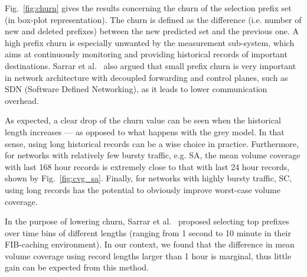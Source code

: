 Fig.~\ref{fig:churn} gives the results concerning the churn of the selection prefix set (in box-plot representation).
The churn is defined as the difference (i.e. number of new and deleted prefixes) between the new predicted set and the previous one. A high prefix churn is especially unwanted by the measurement sub-system, which aims at continuously monitoring and providing historical records of important destinations.  Sarrar et al.\ \cite{Sarrar2012} also argued that small prefix churn is very important in network architecture with decoupled forwarding and control planes, such as SDN (Software Defined Networking), as it leads to lower communication overhead.

As expected, a clear drop of the churn value can be seen when the historical length increases --- as opposed to what happens with the grey model. 
In that sense, using long historical records can be a wise choice in practice.
Furthermore, for networks with relatively few bursty traffic, e.g. SA, the mean volume coverage with last 168 hour records is extremely close to that with last 24 hour records, shown  by Fig.~\ref{fig:cvg_sa}.
Finally, for networks with highly bursty traffic, SC, using long records has the potential to obviously improve worst-case volume coverage. 

In the purpose of lowering churn, Sarrar et al.\ \cite{Sarrar2012} proposed selecting top prefixes over time bins of different lengths (ranging from 1 second to 10 minute in their FIB-caching environment). In our context, we found that the difference in mean volume coverage using record lengths larger than 1 hour is marginal, thus little gain can be expected from this method.  



